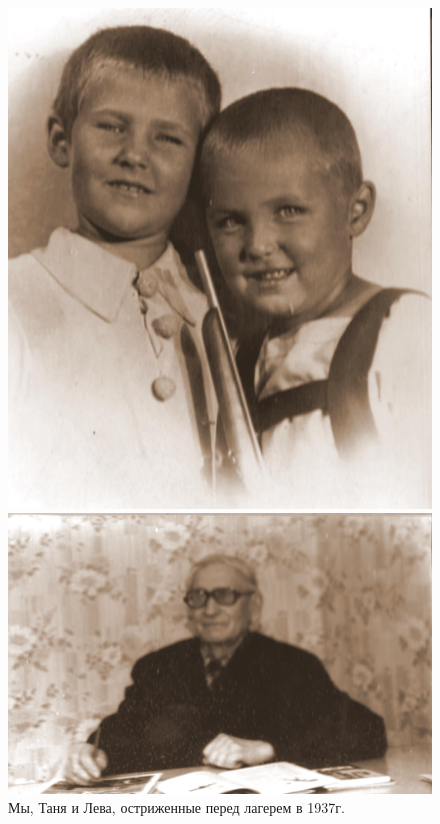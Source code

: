 \documentclass[utf8x, 12pt]{G7-32a} %
\begin{document}
\vfill
\noindent
\begin{figure}[h!]
    \begin{minipage}[h!]{45mm}
        \includegraphics[width=\linewidth]{inc/Menshekovy/men21.JPG}
        \caption{Мы, Таня и Лева, остриженные перед лагерем в 1937г.}
    \end{minipage}
    \hfill
   \begin{minipage}[h]{85mm}
       \includegraphics[width=\linewidth]{inc/Menshekovy/22.jpg} 

\end{minipage}
\end{figure}
\end{document}
